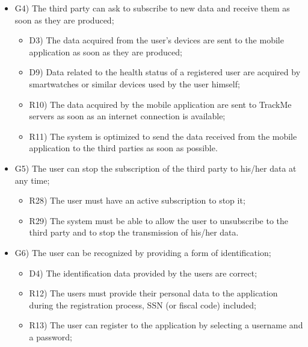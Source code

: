 \documentclass{article}
\begin{document}
\begin{legal}
\begin{legal}
\begin{legal}
\begin{itemize}
{\begin{itemize}
					\end{itemize}
				}
				\item G4) The third party can ask to subscribe to new data and receive them as soon as they are produced;\\
				{\normalfont
					\begin{itemize}
					\item D3) The data acquired from the user’s devices are sent to the mobile application as soon as they are produced;\\
	 				\item D9) Data related to the health status of a registered user are acquired by smartwatches or similar devices used by the user himself;\\
					\item R10) The data acquired by the mobile application are sent to TrackMe servers as soon as an internet connection is available;\\
					\item R11) The system is optimized to send the data received from the mobile application to the third parties as soon as possible.\\
					\end{itemize}
				}
				\item G5) The user can stop the subscription of the third party to his/her data at any time;\\
				{\normalfont
					\begin{itemize}
					\item R28) The user must have an active subscription to stop it;\\
	 				\item R29) The system must be able to allow the user to unsubscribe to the third party and to stop the transmission of his/her data.\\
					\end{itemize}
				}
				\item G6) The user can be recognized by providing a form of identification;\\
				{\normalfont
					\begin{itemize}
					\item D4) The identification data provided by the users are correct;\\
	 				\item R12) The users must provide their personal data to the application during the registration process, SSN (or fiscal code) included;\\
					\item R13) The user can register to the application by selecting a username and a password;\\

\end{itemize}}
\end{itemize}
\end{legal}
\end{legal}
\end{legal}
\end{document}
